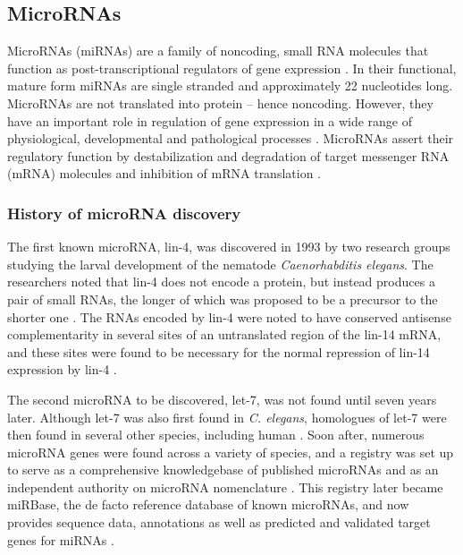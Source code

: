 \subsection{MicroRNAs}\label{micrornas}

MicroRNAs (miRNAs) are a family of noncoding, small RNA molecules that function
as post-transcriptional regulators of gene expression \citep{Ambros2004}. In
their functional, mature form miRNAs are single stranded and approximately 22
nucleotides long. MicroRNAs are not translated into protein -- hence
noncoding. However, they have an important role in regulation of gene
expression in a wide range of physiological, developmental and pathological
processes \citep{Bartel2009}. MicroRNAs assert their regulatory function by destabilization and
degradation of target messenger RNA (mRNA) molecules and inhibition of mRNA
translation \citep{Fabian2010}.



\subsubsection{History of microRNA discovery}

The first known microRNA, lin-4, was discovered in 1993 by two research groups
studying the larval development of the nematode \emph{Caenorhabditis elegans}.
The researchers noted that lin-4 does not encode a protein, but instead
produces a pair of small RNAs, the longer of which was proposed to be a
precursor to the shorter one \citep{Lee1993}. The RNAs encoded by lin-4 were
noted to have conserved antisense complementarity in several sites of an
untranslated region of the lin-14 mRNA, and these sites were found to be
necessary for the normal repression of lin-14 expression by lin-4
\citep{Lee1993,Wightman1993}.

The second microRNA to be discovered, let-7, was not found until seven years
later. Although let-7 was also first found in \emph{C. elegans}, homologues of
let-7 were then found in several other species, including human
\citep{Pasquinelli2000}. Soon after, numerous microRNA genes were found across
a variety of species, and a registry was set up to serve as a comprehensive
knowledgebase of published microRNAs and as an independent authority on
microRNA nomenclature \citep{GriffithsJones2004}. This registry later became
miRBase, the de facto reference database of known microRNAs, and now provides
sequence data, annotations as well as predicted and validated target genes for
miRNAs \citep{Kozomara2014}.

